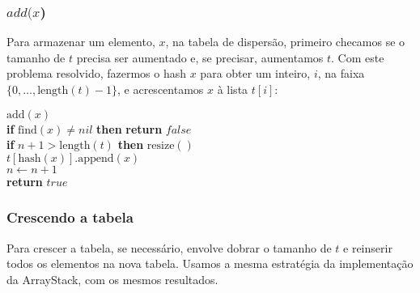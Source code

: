 \documentclass{beamer}
\begin{document}
\begin{frame}
\frametitle{$add(x$)}
Para armazenar um elemento, $ \ensuremath{x}$, na tabela de dispersão, primeiro checamos se o tamanho de $  t$ precisa ser aumentado e, se precisar, aumentamos $ t$. Com este problema resolvido, fazermos o hash $ \ensuremath{x}$ para obter um inteiro, $ \ensuremath{i}$, na faixa $ \{0,\ldots,\ensuremath{\ensuremath{\mathrm{length}(t)}}-1\}$, e acrescentamos $ \ensuremath{x}$ à lista $ \ensuremath{t[i]}$: 
\begin{oframed}
\begin{flushleft}
\hspace*{1em} \ensuremath{\mathrm{add}(x)}\\
\hspace*{1em} \hspace*{1em} {\color{black} \textbf{if}} \ensuremath{\mathrm{find}(x) \ne nil} {\color{black} \textbf{then}}  {\color{black} \textbf{return}} \ensuremath{\ensuremath{\mathit{false}}}\\
\hspace*{1em} \hspace*{1em} {\color{black} \textbf{if}} \ensuremath{n+1 > \mathrm{length}(t)} {\color{black} \textbf{then}}  \ensuremath{\mathrm{resize}()}\\
\hspace*{1em} \hspace*{1em} \ensuremath{t[\mathrm{hash}(x)].\mathrm{append}(x)}\\
\hspace*{1em} \hspace*{1em} \ensuremath{n \gets  \ensuremath{n + 1}}\\
\hspace*{1em} \hspace*{1em} {\color{black} \textbf{return}} \ensuremath{\ensuremath{\mathit{true}}}\\
\end{flushleft}
\end{oframed}

\end{frame}

\begin{frame}
\frametitle{Crescendo a tabela}
Para crescer a tabela, se necessário, envolve dobrar o tamanho de $ t$ e reinserir todos os elementos na nova tabela. Usamos a mesma estratégia da implementação da ArrayStack, com os mesmos resultados.
\end{frame}
\end{document}
